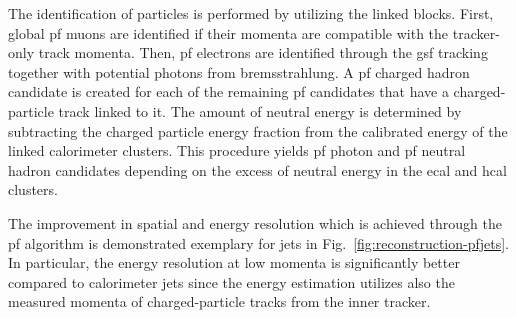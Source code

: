 The identification of particles is performed by utilizing the linked blocks. First, global \gls{pf} muons are identified if their momenta are compatible with the tracker-only track momenta. Then, \gls{pf} electrons are identified through the \gls{gsf} tracking together with potential photons from bremsstrahlung. A \gls{pf} charged hadron candidate is created for each of the remaining \gls{pf} candidates that have a charged-particle track linked to it. The amount of neutral energy is determined by subtracting the charged particle energy fraction from the calibrated energy of the linked calorimeter clusters. This procedure yields \gls{pf} photon and \gls{pf} neutral hadron candidates depending on the excess of neutral energy in the \gls{ecal} and \gls{hcal} clusters.

The improvement in spatial and energy resolution which is achieved through the \gls{pf} algorithm is demonstrated exemplary for jets in Fig.~\ref{fig:reconstruction-pfjets}. In particular, the energy resolution at low momenta is significantly better compared to calorimeter jets since the energy estimation utilizes also the measured momenta of charged-particle tracks from the inner tracker.


